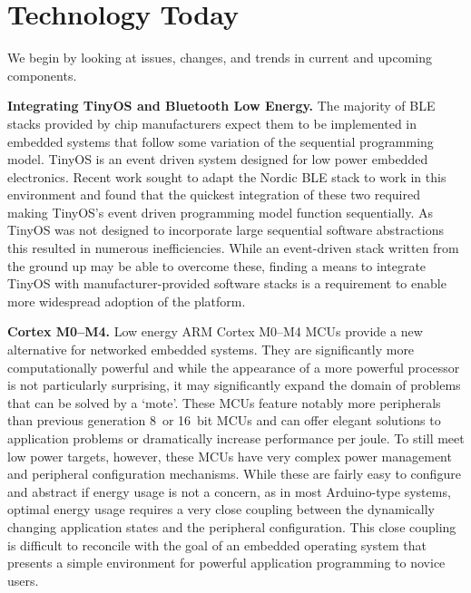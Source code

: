 \section{Technology Today}
We begin by looking at issues, changes, and trends in current and upcoming components.

\smallskip\noindent
\textbf{Integrating TinyOS and Bluetooth Low Energy.}
The majority of BLE stacks provided by chip manufacturers expect them to be
implemented in embedded systems that follow some variation of the sequential
programming model. TinyOS is an event driven system designed for low power
embedded electronics. Recent work sought to adapt the Nordic BLE stack to
work in this environment and found that the quickest integration of these two required
making TinyOS's event driven programming model function sequentially. As TinyOS
was not designed to incorporate large sequential software abstractions this
resulted in numerous inefficiencies. While an event-driven stack written from
the ground up may be able to overcome these, finding a means to integrate
TinyOS with manufacturer-provided software stacks is a requirement to enable
more widespread adoption of the platform.


\smallskip\noindent
\textbf{Cortex M0--M4.}
Low energy ARM Cortex M0--M4 MCUs provide a new alternative for
networked embedded systems. They are significantly more computationally
powerful and while the appearance of a more powerful processor is not
particularly surprising, it may significantly expand the domain of problems
that can be solved by a `mote'.
%
These MCUs
feature notably more peripherals than previous generation 8~or 16~bit
MCUs and can offer elegant solutions to application problems
or dramatically increase performance per joule. To still meet low
power targets, however, these MCUs have very complex power
management and peripheral configuration mechanisms. While these are fairly
easy to configure and abstract if energy usage is not a concern, as in most
Arduino-type systems, optimal energy usage requires a very close coupling
between the dynamically changing application states and the peripheral
configuration. This close coupling is difficult to reconcile with the goal of
an embedded operating system that presents a simple environment for powerful
application programming to novice users.

